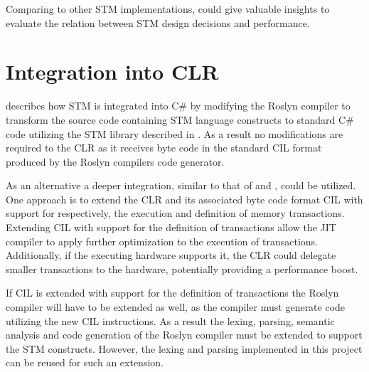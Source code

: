 Comparing \stmname to other \ac{STM} implementations, could give valuable insights to evaluate the relation between \ac{STM} design decisions and performance.

\section{Integration into \acs{CLR}}\label{sec:fut_inte_clr}
 describes how \ac{STM} is integrated into C\# by modifying the Roslyn compiler to transform the source code containing \ac{STM} language constructs to standard C\# code utilizing the \ac{STM} library described in . As a result no modifications are required to the \ac{CLR} as it receives byte code in the standard \ac{CIL} format produced by the Roslyn compilers code generator.

As an alternative a deeper integration, similar to that of \cite{harris2003language} and \cite{duffy2010stmnet}, could be utilized. One approach is to extend the \ac{CLR} and its associated byte code format \ac{CIL} with support for respectively, the execution and definition of memory transactions. Extending \ac{CIL} with support for the definition of transactions allow the \ac{JIT} compiler to apply further optimization to the execution of transactions. Additionally, if the executing hardware supports it, the \ac{CLR} could delegate smaller transactions to the hardware, potentially providing a performance boost.

If \ac{CIL} is extended with support for the definition of transactions the Roslyn compiler will have to be extended as well, as the compiler must generate code utilizing the new \ac{CIL} instructions. As a result the lexing, parsing, semantic analysis and code generation of the Roslyn compiler must be extended to support the \ac{STM} constructs. However, the lexing and parsing implemented in this project can be reused for such an extension.
% 
